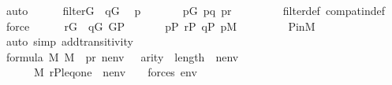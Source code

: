 \begin{isabellebody}
\ auto\isanewline
\ \ \ \ \isamarkupfalse%
\ {\isacartoucheopen}filter{\isacharparenleft}{\kern0pt}G{\isacharparenright}{\kern0pt}{\isacartoucheclose}\ \ {\isacartoucheopen}q{\isasymin}G{\isacartoucheclose}\ \isamarkupfalse%
\ p\ \isanewline
\ \ \ \ \ \ {\isachardoublequoteopen}p{\isasymin}G{\isachardoublequoteclose}\ {\isachardoublequoteopen}p{\isasympreceq}q{\isachardoublequoteclose}\ {\isachardoublequoteopen}p{\isasympreceq}r{\isachardoublequoteclose}\ \isanewline
\ \ \ \ \ \ \isamarkupfalse%
\ filter{\isacharunderscore}{\kern0pt}def\ compat{\isacharunderscore}{\kern0pt}in{\isacharunderscore}{\kern0pt}def\ \isamarkupfalse%
\ force\isanewline
\ \ \ \ \isamarkupfalse%
\ {\isacartoucheopen}r{\isasymin}G{\isacartoucheclose}\ \ {\isacartoucheopen}q{\isasymin}G{\isacartoucheclose}\ {\isacartoucheopen}G{\isasymsubseteq}P{\isacartoucheclose}\ \isanewline
\ \ \ \ \isamarkupfalse%
\ {\isachardoublequoteopen}p{\isasymin}P{\isachardoublequoteclose}\ {\isachardoublequoteopen}r{\isasymin}P{\isachardoublequoteclose}\ {\isachardoublequoteopen}q{\isasymin}P{\isachardoublequoteclose}\ {\isachardoublequoteopen}p{\isasymin}M{\isachardoublequoteclose}\isanewline
\ \ \ \ \ \ \isamarkupfalse%
\ \ P{\isacharunderscore}{\kern0pt}in{\isacharunderscore}{\kern0pt}M\ \ \isamarkupfalse%
\ {\isacharparenleft}{\kern0pt}auto\ simp\ add{\isacharcolon}{\kern0pt}transitivity{\isacharparenright}{\kern0pt}\isanewline
\ \ \ \ \isamarkupfalse%
\ {\isacartoucheopen}{\isasymphi}{\isasymin}formula{\isacartoucheclose}\ {\isacartoucheopen}{\isasymtheta}{\isasymin}M{\isacartoucheclose}\ {\isacartoucheopen}{\isasympi}{\isasymin}M{\isacartoucheclose}\ \ {\isacartoucheopen}p{\isasympreceq}r{\isacartoucheclose}\ {\isacartoucheopen}nenv\ {\isasymin}\ {\isacharunderscore}{\kern0pt}{\isacartoucheclose}\ {\isacartoucheopen}arity{\isacharparenleft}{\kern0pt}{\isacharquery}{\kern0pt}{\isasymchi}{\isacharparenright}{\kern0pt}\ {\isasymle}\ length{\isacharparenleft}{\kern0pt}{\isacharbrackleft}{\kern0pt}{\isasymtheta}{\isacharbrackright}{\kern0pt}\ {\isacharat}{\kern0pt}\ nenv\ {\isacharat}{\kern0pt}\ {\isacharbrackleft}{\kern0pt}{\isasympi}{\isacharbrackright}{\kern0pt}{\isacharparenright}{\kern0pt}{\isacartoucheclose}\isanewline
\ \ \ \ \ \ {\isacartoucheopen}M{\isacharcomma}{\kern0pt}\ {\isacharbrackleft}{\kern0pt}r{\isacharcomma}{\kern0pt}P{\isacharcomma}{\kern0pt}leq{\isacharcomma}{\kern0pt}one{\isacharcomma}{\kern0pt}{\isasymtheta}{\isacharbrackright}{\kern0pt}\ {\isacharat}{\kern0pt}\ nenv\ {\isacharat}{\kern0pt}\ {\isacharbrackleft}{\kern0pt}{\isasympi}{\isacharbrackright}{\kern0pt}\ {\isasymTurnstile}\ forces{\isacharparenleft}{\kern0pt}{\isacharquery}{\kern0pt}{\isasymchi}{\isacharparenright}{\kern0pt}{\isacartoucheclose}\ {\isacartoucheopen}env{\isasymin}{\isacharunderscore}{\kern0pt}{\isacartoucheclose}\isanewline

\end{isabellebody}

